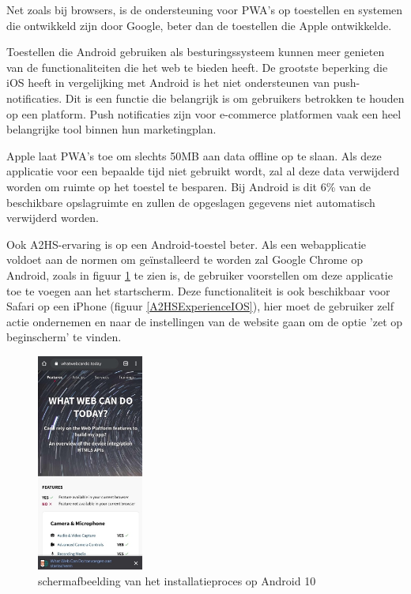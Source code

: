		Net zoals bij browsers, is de ondersteuning voor PWA's op toestellen en systemen die ontwikkeld zijn door Google, beter dan de toestellen die Apple ontwikkelde.
		
		Toestellen die Android gebruiken als besturingssysteem kunnen meer genieten van de functionaliteiten die het web te bieden heeft.
		De grootste beperking die iOS heeft in vergelijking met Android is het niet ondersteunen van push-notificaties. Dit is een functie die belangrijk is om gebruikers betrokken te houden op een platform. Push notificaties zijn voor e-commerce platformen vaak een heel belangrijke tool binnen hun marketingplan.
		\autocite{Anastasia2017}
		
		Apple laat PWA's toe om slechts 50MB aan data offline op te slaan. Als deze applicatie voor een bepaalde tijd niet gebruikt wordt, zal al deze data verwijderd worden om ruimte op het toestel te besparen. Bij Android is dit 6\% van de beschikbare opslagruimte en zullen de opgeslagen gegevens niet automatisch verwijderd worden.
		
		Ook A2HS-ervaring is op een Android-toestel beter. Als een webapplicatie voldoet aan de normen om geïnstalleerd te worden zal Google Chrome op Android, zoals in figuur \ref{A2HSExperienceAndroid} te zien is, de gebruiker voorstellen om deze applicatie toe te voegen aan het startscherm. Deze functionaliteit is ook beschikbaar voor Safari op een iPhone (figuur \ref{A2HSExperienceIOS}), hier moet de gebruiker zelf actie ondernemen en naar de instellingen van de website gaan om de optie 'zet op beginscherm' te vinden.
		
		\begin{figure}[H]
			\centering
			\includegraphics[width=35mm]{./img/installation_android.png}
			\caption{schermafbeelding van het installatieproces op Android 10}
			\label{A2HSExperienceAndroid}
		\end{figure}
			
